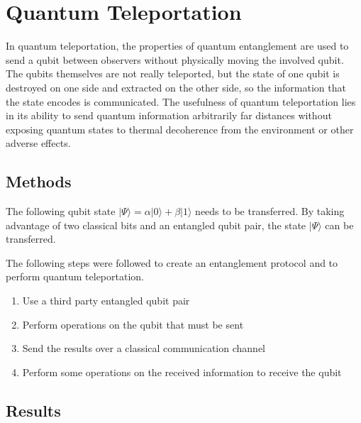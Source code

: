 \renewcommand{\chaptername}{March 15th: Lab}
\chapter{Quantum Teleportation}
In quantum teleportation, the properties of quantum entanglement are used to send a qubit between observers without physically moving the involved qubit. The qubits themselves are not really teleported, but the state of one qubit is destroyed on one side and extracted on the other side, so the information that the state encodes is communicated. The usefulness of quantum teleportation lies in its ability to send quantum information arbitrarily far distances without exposing quantum states to thermal decoherence from the environment or other adverse effects.

\section{Methods}

The following qubit state  $|\Psi \rangle = \alpha |0 \rangle + \beta |1 \rangle$ needs to be transferred. By taking advantage of two classical bits and an entangled qubit pair, the state $|\Psi \rangle$ can be transferred.

The following steps were followed to create an entanglement protocol and to perform quantum teleportation.

\begin{enumerate}
    \item Use a third party entangled qubit pair
    \item Perform operations on the qubit that must be sent
    \item Send the results over a classical communication channel
    \item Perform some operations on the received information to receive the qubit
\end{enumerate}

\section{Results}

